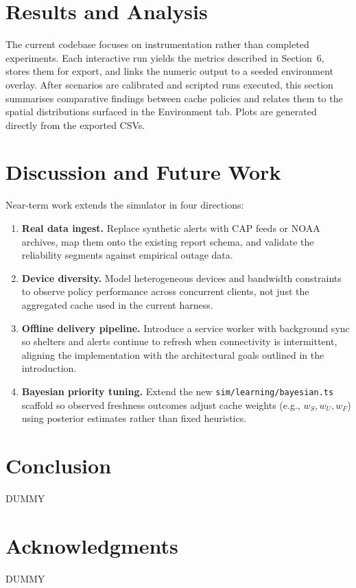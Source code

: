 \section{Results and Analysis}
The current codebase focuses on instrumentation rather than completed experiments. Each interactive run yields the metrics described in Section~6, stores them for export, and links the numeric output to a seeded environment overlay. After scenarios are calibrated and scripted runs executed, this section summarises comparative findings between cache policies and relates them to the spatial distributions surfaced in the Environment tab. Plots are generated directly from the exported CSVs.

\section{Discussion and Future Work}
\label{sec:discussion-future}
Near-term work extends the simulator in four directions:

\begin{enumerate}
    \item \textbf{Real data ingest.} Replace synthetic alerts with CAP feeds or NOAA archives, map them onto the existing report schema, and validate the reliability segments against empirical outage data.
    \item \textbf{Device diversity.} Model heterogeneous devices and bandwidth constraints to observe policy performance across concurrent clients, not just the aggregated cache used in the current harness.
    \item \textbf{Offline delivery pipeline.} Introduce a service worker with background sync so shelters and alerts continue to refresh when connectivity is intermittent, aligning the implementation with the architectural goals outlined in the introduction.
    \item \textbf{Bayesian priority tuning.} Extend the new \texttt{sim/learning/bayesian.ts} scaffold so observed freshness outcomes adjust cache weights (e.g., $w_S, w_U, w_F$) using posterior estimates rather than fixed heuristics.
\end{enumerate}

\section{Conclusion}
DUMMY

\section*{Acknowledgments}
DUMMY
